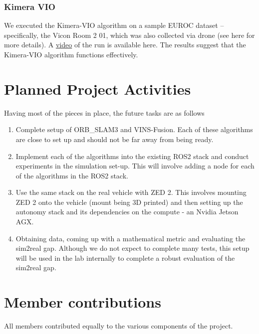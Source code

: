 \documentclass{article}
\begin{document}
\subsubsection*{Kimera VIO}
We executed the Kimera-VIO algorithm on a sample EUROC dataset – specifically, the Vicon Room 2 01, which was also collected via drone (see here for more details). A \href{https://uwmadison.box.com/s/6fg0vdrrqs0u74fcvunobefagvzrdkbu}{video} of the run is available here. The results suggest that the Kimera-VIO algorithm functions effectively.

\section{Planned Project Activities}
Having most of the pieces in place, the future tasks are as follows
\begin{enumerate}
    \item Complete setup of ORB\_SLAM3 and VINS-Fusion. Each of these algorithms are close to set up and should not be far away from being ready. 
    \item Implement each of the algorithms into the existing ROS2 stack and conduct experiments in the simulation set-up. This will involve adding a node for each of the algorithms in the ROS2 stack.
    \item Use the same stack on the real vehicle with ZED 2. This involves mounting ZED 2 onto the vehicle (mount being 3D printed) and then setting up the autonomy stack and its dependencies on the compute - an Nvidia Jetson AGX.
    \item Obtaining data, coming up with a mathematical metric and evaluating the sim2real gap. Although we do not expect to complete many tests, this setup will be used in the lab internally to complete a robust evaluation of the sim2real gap.
\end{enumerate}

\section{Member contributions}
All members contributed equally to the various components of the project.
\end{document}
